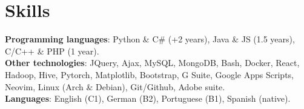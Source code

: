 \documentclass[letterpaper,11pt]{article}
\newcommand{\resumeItem}[1]{
  \item\small{
    {#1 \vspace{-2pt}}
  }
}
\newcommand{\resumeItemListStart}{\begin{itemize}}
\newcommand{\resumeItemListEnd}{\end{itemize}\vspace{-5pt}}
\begin{document}

    


%
\section{Skills}
 \begin{itemize}[leftmargin=0.15in, label={}]
    \small{\item{
     \textbf{Programming languages}{: Python \& C\# (+2 years), Java \& JS (1.5 years), C/C++ \& PHP (1 year).} \\
     \textbf{Other technologies}{: JQuery, Ajax, MySQL, MongoDB, Bash, Docker, React, Hadoop, Hive, Pytorch,
     Matplotlib, Bootstrap, G Suite, Google Apps Scripts, Neovim, Linux (Arch \& Debian), Git/Github, Adobe suite.} \\
     \textbf{Languages}{: English (C1), German (B2), Portuguese (B1), Spanish (native).}
    }}
 \end{itemize}


\end{document}

